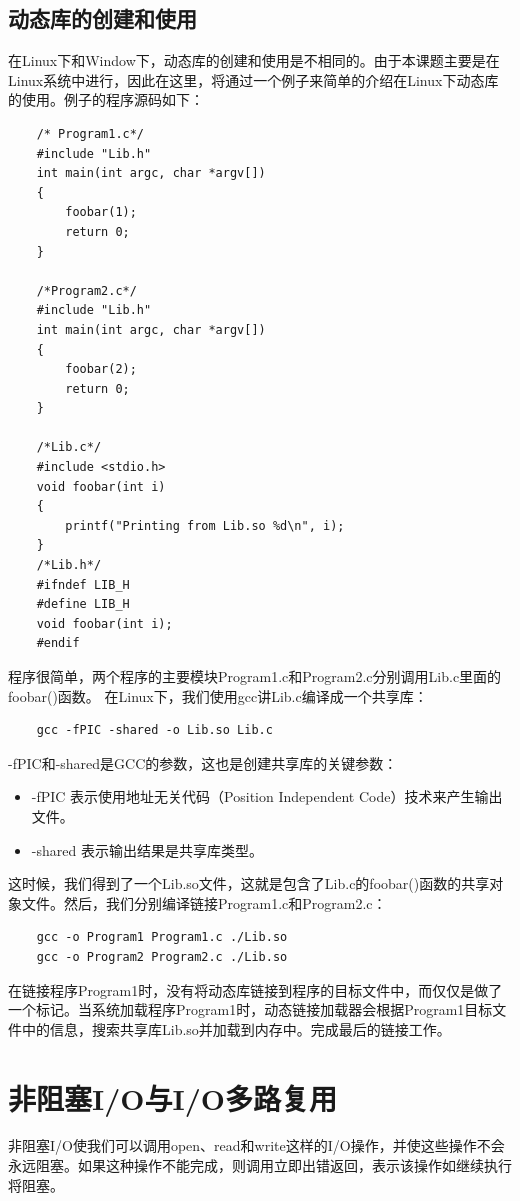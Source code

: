\documentclass[twoside, xetex]{report}
\begin{document}
	\subsection{动态库的创建和使用}
	在Linux下和Window下，动态库的创建和使用是不相同的。由于本课题主要是在Linux系统中进行，因此在这里，将通过一个例子来简单的介绍在Linux下动态库的使用。例子的程序源码如下：
	\begin{verbatim}
	/* Program1.c*/
	#include "Lib.h"
	int main(int argc, char *argv[])
	{
		foobar(1);
		return 0;
	}
	
	/*Program2.c*/
	#include "Lib.h"
	int main(int argc, char *argv[])
	{
		foobar(2);
		return 0;
	}
	
	/*Lib.c*/
	#include <stdio.h>
	void foobar(int i)
	{
		printf("Printing from Lib.so %d\n", i);
	}
	/*Lib.h*/
	#ifndef LIB_H
	#define LIB_H
	void foobar(int i);
	#endif
	\end{verbatim}
	程序很简单，两个程序的主要模块Program1.c和Program2.c分别调用Lib.c里面的foobar()函数。
	在Linux下，我们使用gcc讲Lib.c编译成一个共享库：
\begin{verbatim}
	gcc -fPIC -shared -o Lib.so Lib.c
\end{verbatim}
	-fPIC和-shared是GCC的参数，这也是创建共享库的关键参数：
	\begin{itemize}
		\item -fPIC 表示使用地址无关代码（Position Independent Code）技术来产生输出文件。
		\item -shared 表示输出结果是共享库类型。
	\end{itemize}
	
	这时候，我们得到了一个Lib.so文件，这就是包含了Lib.c的foobar()函数的共享对象文件。然后，我们分别编译链接Program1.c和Program2.c：
	\begin{verbatim}
	gcc -o Program1 Program1.c ./Lib.so
	gcc -o Program2 Program2.c ./Lib.so
	\end{verbatim}
	在链接程序Program1时，没有将动态库链接到程序的目标文件中，而仅仅是做了一个标记。当系统加载程序Program1时，动态链接加载器会根据Program1目标文件中的信息，搜索共享库Lib.so并加载到内存中。完成最后的链接工作。
	
\section{非阻塞I/O与I/O多路复用}
	非阻塞I/O使我们可以调用open、read和write这样的I/O操作，并使这些操作不会永远阻塞。如果这种操作不能完成，则调用立即出错返回，表示该操作如继续执行将阻塞。
	
\end{document}
